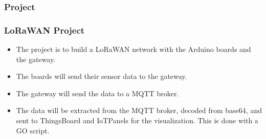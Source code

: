 \documentclass{beamer}
\begin{document}
\subsubsection{Project}
\begin{frame}
    \frametitle{LoRaWAN Project}
    \begin{itemize}[<+->]
        \item The project is to build a LoRaWAN network with the Arduino boards and the
              gateway.
        \item The boards will send their sensor data to the gateway.
        \item The gateway will send the data to a MQTT broker.
        \item The data will be extracted from the MQTT broker, decoded from base64, and sent
              to ThingsBoard and IoTPanels for the visualization. This is done with a GO
              script.
    \end{itemize}
\end{frame}
\end{document}

